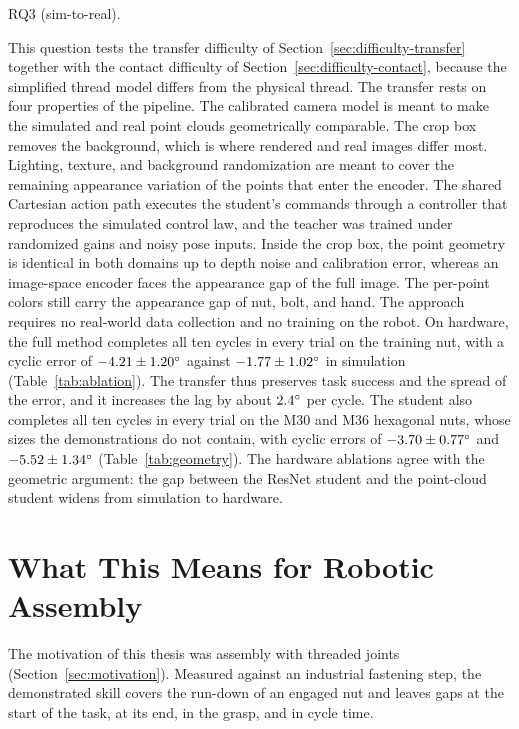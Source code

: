 \begin{description}
  \item[RQ3 (sim-to-real).] \RQthree
\end{description}
This question tests the transfer difficulty of Section~\ref{sec:difficulty-transfer} together with the contact difficulty of Section~\ref{sec:difficulty-contact}, because the simplified thread model differs from the physical thread. The transfer rests on four properties of the pipeline. The calibrated camera model is meant to make the simulated and real point clouds geometrically comparable. The crop box removes the background, which is where rendered and real images differ most. Lighting, texture, and background randomization are meant to cover the remaining appearance variation of the points that enter the encoder. The shared Cartesian action path executes the student's commands through a controller that reproduces the simulated control law, and the teacher was trained under randomized gains and noisy pose inputs. Inside the crop box, the point geometry is identical in both domains up to depth noise and calibration error, whereas an image-space encoder faces the appearance gap of the full image. The per-point colors still carry the appearance gap of nut, bolt, and hand. The approach requires no real-world data collection and no training on the robot. On hardware, the full method completes all ten cycles in every trial on the training nut, with a cyclic error of $-4.21\pm1.20^\circ$ against $-1.77\pm1.02^\circ$ in simulation (Table~\ref{tab:ablation}). The transfer thus preserves task success and the spread of the error, and it increases the lag by about $2.4^\circ$ per cycle. The student also completes all ten cycles in every trial on the M30 and M36 hexagonal nuts, whose sizes the demonstrations do not contain, with cyclic errors of $-3.70\pm0.77^\circ$ and $-5.52\pm1.34^\circ$ (Table~\ref{tab:geometry}). The hardware ablations agree with the geometric argument: the gap between the ResNet student and the point-cloud student widens from simulation to hardware.
\section{What This Means for Robotic Assembly}\label{sec:disc-assembly}

The motivation of this thesis was assembly with threaded joints (Section~\ref{sec:motivation}). Measured against an industrial fastening step, the demonstrated skill covers the run-down of an engaged nut and leaves gaps at the start of the task, at its end, in the grasp, and in cycle time.

